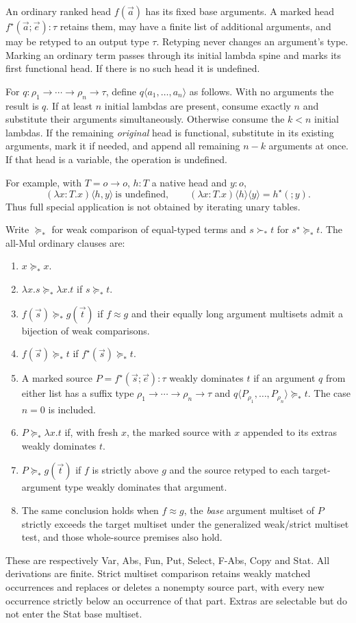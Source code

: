 \documentclass[11pt,a4paper]{article}
\newcommand{\ang}[2]{#1\langle #2\rangle}
\begin{document}
An ordinary ranked head $f(\vec a)$ has its fixed base arguments.  A marked
head $f^\star(\vec a;\vec e):\tau$ retains them, may have a finite list of
additional arguments, and may be retyped to an output type $\tau$.
Retyping never changes an argument's type.  Marking an ordinary term passes
through its initial lambda spine and marks its first functional head.  If
there is no such head it is undefined.

\begin{definition}\label{def:angle}
For $q:\rho_1\to\cdots\to\rho_n\to\tau$, define
$\ang q{a_1,\ldots,a_n}$ as follows.  With no arguments the result is $q$.
If at least $n$ initial lambdas are present, consume exactly $n$ and substitute
their arguments simultaneously.  Otherwise consume the $k<n$ initial lambdas.
If the remaining \emph{original} head is functional, substitute in its existing
arguments, mark it if needed, and append all remaining $n-k$ arguments at once.
If that head is a variable, the operation is undefined.
\end{definition}
For example, with $T=o\to o$, $h:T$ a native head and $y:o$,
\[
 \ang{(\lambda x:T.x)}{h,y}\ \text{is undefined},\qquad
 \ang{\ang{(\lambda x:T.x)}h}y=h^\star(;y).
\]
Thus full special application is not obtained by iterating unary tables.

Write $\succeq_*$ for weak comparison of equal-typed terms and
$s\succ_*t$ for $s^\star\succeq_*t$.  The all-Mul ordinary clauses are:
\begin{enumerate}
\item $x\succeq_*x$.
\item $\lambda x.s\succeq_*\lambda x.t$ if $s\succeq_*t$.
\item $f(\vec s)\succeq_*g(\vec t)$ if $f\approx g$ and their equally long
argument multisets admit a bijection of weak comparisons.
\item $f(\vec s)\succeq_*t$ if $f^\star(\vec s)\succeq_*t$.
\item A marked source $P=f^\star(\vec s;\vec e):\tau$ weakly dominates $t$
if an argument $q$ from either list has a suffix type
$\rho_1\to\cdots\to\rho_n\to\tau$ and
$\ang q{P_{\rho_1},\ldots,P_{\rho_n}}\succeq_*t$.
The case $n=0$ is included.
\item $P\succeq_*\lambda x.t$ if, with fresh $x$, the marked source with $x$
appended to its extras weakly dominates $t$.
\item $P\succeq_*g(\vec t)$ if $f$ is strictly above $g$ and the source
retyped to each target-argument type weakly dominates that argument.
\item The same conclusion holds when $f\approx g$, the \emph{base} argument
multiset of $P$ strictly exceeds the target multiset under the generalized
weak/strict multiset test, and those whole-source premises also hold.
\end{enumerate}
These are respectively Var, Abs, Fun, Put, Select, F-Abs, Copy and Stat.
All derivations are finite.  Strict multiset comparison retains weakly matched
occurrences and replaces or deletes a nonempty source part, with every new
occurrence strictly below an occurrence of that part.  Extras are selectable
but do not enter the Stat base multiset.
\end{document}
